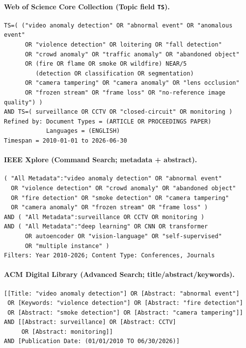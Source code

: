 \documentclass[10pt,a4paper]{article}
\begin{document}
\paragraph{Web of Science Core Collection (Topic field \texttt{TS}).}
\begin{small}
\begin{verbatim}
TS=( ("video anomaly detection" OR "abnormal event" OR "anomalous event"
      OR "violence detection" OR loitering OR "fall detection"
      OR "crowd anomaly" OR "traffic anomaly" OR "abandoned object"
      OR (fire OR flame OR smoke OR wildfire) NEAR/5
         (detection OR classification OR segmentation)
      OR "camera tampering" OR "camera anomaly" OR "lens occlusion"
      OR "frozen stream" OR "frame loss" OR "no-reference image quality") )
AND TS=( surveillance OR CCTV OR "closed-circuit" OR monitoring )
Refined by: Document Types = (ARTICLE OR PROCEEDINGS PAPER)
            Languages = (ENGLISH)
Timespan = 2010-01-01 to 2026-06-30
\end{verbatim}
\end{small}

\paragraph{IEEE Xplore (Command Search; metadata + abstract).}
\begin{small}
\begin{verbatim}
( "All Metadata":"video anomaly detection" OR "abnormal event"
  OR "violence detection" OR "crowd anomaly" OR "abandoned object"
  OR "fire detection" OR "smoke detection" OR "camera tampering"
  OR "camera anomaly" OR "frozen stream" OR "frame loss" )
AND ( "All Metadata":surveillance OR CCTV OR monitoring )
AND ( "All Metadata":"deep learning" OR CNN OR transformer
      OR autoencoder OR "vision-language" OR "self-supervised"
      OR "multiple instance" )
Filters: Year 2010-2026; Content Type: Conferences, Journals
\end{verbatim}
\end{small}

\paragraph{ACM Digital Library (Advanced Search; title/abstract/keywords).}
\begin{small}
\begin{verbatim}
[[Title: "video anomaly detection"] OR [Abstract: "abnormal event"]
 OR [Keywords: "violence detection"] OR [Abstract: "fire detection"]
 OR [Abstract: "smoke detection"] OR [Abstract: "camera tampering"]]
AND [[Abstract: surveillance] OR [Abstract: CCTV]
     OR [Abstract: monitoring]]
AND [Publication Date: (01/01/2010 TO 06/30/2026)]
\end{verbatim}
\end{small}
\end{document}
